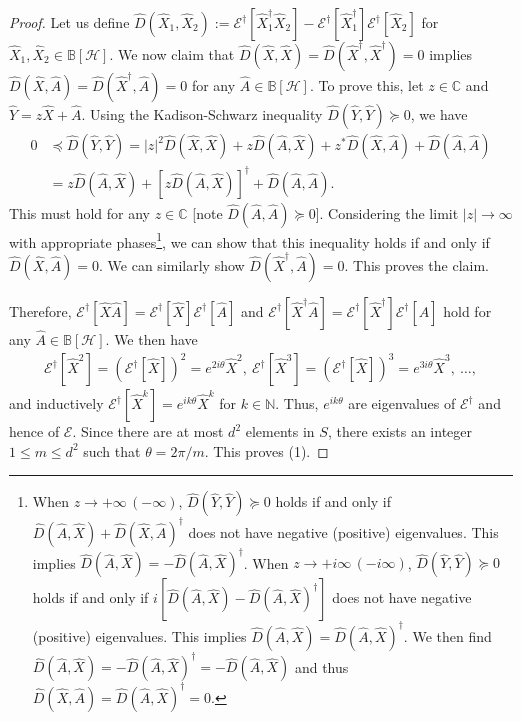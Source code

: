\documentclass[preprint,pteplogo]{ptephy_v2}%
\numberwithin{equation}{section}
\theoremstyle{definition}
\newcommand{\mc}[1]{\mathcal{#1}}
\newcommand{\mbb}[1]{\mathbb{#1}}
\begin{document}
\begin{proof}
Let us define $\hat{D}(\hat{X}_1, \hat{X}_2) := \mc{E}^\dagger[\hat{X}_1^\dagger \hat{X}_2] - \mc{E}^\dagger[\hat{X}_1^\dagger] \mc{E}^\dagger[\hat{X}_2]$ for $\hat{X}_1, \hat{X}_2 \in \mbb{B}[\mc{H}]$.
We now claim that $\hat{D}(\hat{X}, \hat{X}) = \hat{D}(\hat{X}^\dagger, \hat{X}^\dagger)=0$ implies $\hat{D}(\hat{X}, \hat{A}) = \hat{D}(\hat{X}^\dagger, \hat{A}) = 0$ for any $\hat{A} \in \mbb{B}[\mc{H}]$.
To prove this, let $z \in \mbb{C}$ and $\hat{Y} = z \hat{X} + \hat{A}$. Using the Kadison-Schwarz inequality $\hat{D}(\hat{Y}, \hat{Y}) \succeq 0$, we have
\begin{align}
0 
&\preceq \hat{D}(\hat{Y}, \hat{Y}) 
= |z|^2 \hat{D}(\hat{X}, \hat{X}) + z\hat{D}(\hat{A}, \hat{X}) + z^* \hat{D}(\hat{X}, \hat{A}) +\hat{D}(\hat{A}, \hat{A}) \nonumber \\
&= z \hat{D}(\hat{A}, \hat{X}) + [z \hat{D}(\hat{A}, \hat{X})]^\dagger + \hat{D}(\hat{A}, \hat{A}).
\end{align}
This must hold for any $z \in \mbb{C}$ [note $\hat{D}(\hat{A}, \hat{A}) \succeq 0$].
Considering the limit $|z| \to \infty$ with appropriate phases\footnote{
When $z \to +\infty  \, (-\infty)$, $\hat{D}(\hat{Y}, \hat{Y}) \succeq 0$ holds if and only if $\hat{D}(\hat{A}, \hat{X}) + \hat{D}(\hat{X}, \hat{A})^\dagger$ does not have negative (positive) eigenvalues.
This implies $\hat{D}(\hat{A}, \hat{X}) = -\hat{D}(\hat{A}, \hat{X})^\dagger$.
When $z \to  +i \infty \, (-i \infty)$, $\hat{D}(\hat{Y}, \hat{Y}) \succeq 0$ holds if and only if $i[\hat{D}(\hat{A}, \hat{X}) - \hat{D}(\hat{A}, \hat{X})^\dagger]$ does not have negative (positive) eigenvalues.
This implies $\hat{D}(\hat{A}, \hat{X}) = \hat{D}(\hat{A}, \hat{X})^\dagger$.
We then find $\hat{D}(\hat{A}, \hat{X}) = -\hat{D}(\hat{A}, \hat{X})^\dagger = -\hat{D}(\hat{A}, \hat{X})$ and thus $\hat{D}(\hat{X}, \hat{A}) = \hat{D}(\hat{A}, \hat{X})^\dagger =0$.
},
we can show that this inequality holds if and only if $\hat{D}(\hat{X}, \hat{A})=0$.
We can similarly show $\hat{D}(\hat{X}^\dagger, \hat{A}) = 0$.
This proves the claim.

Therefore, $\mc{E}^\dagger[\hat{X} \hat{A}] = \mc{E}^\dagger[\hat{X}] \mc{E}^\dagger[\hat{A}]$ and $\mc{E}^\dagger[\hat{X}^\dagger \hat{A}] = \mc{E}^\dagger[\hat{X}^\dagger] \mc{E}^\dagger[\hat{A}]$ hold for any $\hat{A} \in \mbb{B}[\mc{H}]$.
We then have
\begin{align}
\mc{E}^\dagger[\hat{X}^2] = (\mc{E}^\dagger[\hat{X}])^2 = e^{2i\theta} \hat{X}^2, \ \mc{E}^\dagger[\hat{X}^3] = (\mc{E}^\dagger[\hat{X}])^3 = e^{3i\theta} \hat{X}^3, \ \ldots,
\end{align}
and inductively $\mc{E}^\dagger[\hat{X}^k] = e^{ik\theta} \hat{X}^k$ for $k \in \mbb{N}$.
Thus, $e^{ik\theta}$ are eigenvalues of $\mc{E}^\dagger$ and hence of $\mc{E}$.
Since there are at most $d^2$ elements in $S$, there exists an integer $1 \leq m \leq d^2$ such that $\theta = 2\pi/m$.
This proves (1).


\end{proof}
\end{document}
